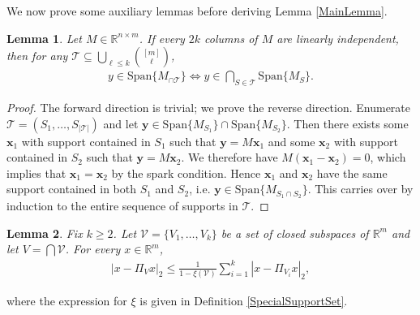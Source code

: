 \documentclass[journal, onecolumn]{IEEEtran}
\newtheorem{lemma}{Lemma}
\begin{document}
We now prove some auxiliary lemmas before deriving Lemma \ref{MainLemma}.


\begin{lemma}\label{SpanIntersectionLemma}
Let $M \in \mathbb{R}^{n \times m}$. If every $2k$ columns of $M$ are linearly independent, then for any $\mathcal{T} \subseteq \bigcup_{\ell \leq k} {[m] \choose \ell}$,
\begin{align}
y \in \text{Span}\{M_{\cap \mathcal{T}}\}  \Longleftrightarrow y \in \bigcap_{S \in \mathcal{T}} \text{Span}\{M_S\}.
\end{align}
\end{lemma}

\begin{proof}The forward direction is trivial; we prove the reverse direction. Enumerate $\mathcal{T} = (S_1, \ldots, S_{|\mathcal{T}|})$ and let $\mathbf{y} \in \text{Span}\{M_{S_1}\} \cap \text{Span}\{M_{S_2}\}$. Then there exists some $\mathbf{x}_1$ with support contained in $S_1$ such that $\mathbf{y} = M\mathbf{x}_1$ and some $\mathbf{x}_2$ with support contained in $S_2$ such that $\mathbf{y} = M\mathbf{x}_2$. We therefore have $M(\mathbf{x}_1 - \mathbf{x}_2) = 0$, which implies that $\mathbf{x}_1 = \mathbf{x}_2$ by the spark condition. Hence $\mathbf{x}_1$ and $\mathbf{x}_2$ have the same support contained in both $S_1$ and $S_2$, i.e. $\mathbf{y} \in \text{Span}\{M_{S_1 \cap S_2}\}$. This carries over by induction to the entire sequence of supports in $\mathcal{T}$. 
\end{proof}


\begin{lemma}\label{DistanceToIntersectionLemma}
Fix $k \geq 2$. Let $\mathcal{V} = \{V_1, \ldots, V_k\}$ be a set of closed subspaces of $\mathbb{R}^m$ and let $V = \bigcap \mathcal{V}$. For every $x \in \mathbb{R}^m$,
\begin{align}\label{DTILeq}
|x - \Pi_V x|_2 \leq \frac{1}{1 - \xi(\mathcal{V})} \sum_{i=1}^k |x - \Pi_{V_i} x|_2,
\end{align}
\end{lemma}
where the expression for $\xi$ is given in Definition \ref{SpecialSupportSet}.
\end{document}

